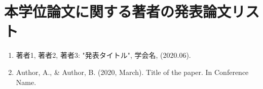 \chapter*{本学位論文に関する著者の発表論文リスト}
\begin{enumerate}
\item 著者1, 著者2, 著者3: "発表タイトル", 学会名, (2020.06).
\item Author, A., \& Author, B. (2020, March). Title of the paper. In Conference Name.
\end{enumerate}
